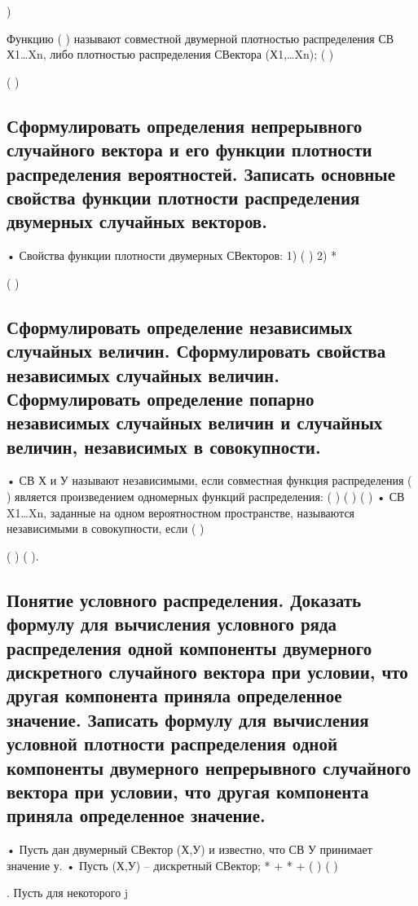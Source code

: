 )





Функцию (
) называют совместной двумерной плотностью распределения СВ Х1…Xn, либо плотностью распределения СВектора
(Х1,…Xn); (
)

( )



\subsection{Сформулировать определения непрерывного случайного вектора и его функции плотности распределения вероятностей. Записать основные свойства функции плотности распределения двумерных случайных векторов.}

• Свойства функции плотности двумерных СВекторов:
1) ( )
2) *

( ) 

\subsection{Сформулировать определение независимых случайных величин. Сформулировать свойства независимых случайных величин. Сформулировать определение попарно независимых случайных величин и случайных величин, независимых в совокупности.}

• СВ Х и У называют независимыми, если совместная функция распределения ( ) является произведением одномерных функций
распределения: ( )
( )
( )
• СВ X1…Xn, заданные на одном вероятностном пространстве, называются независимыми в совокупности, если
(
)


( )
( ).

\subsection{Понятие условного распределения. Доказать формулу для вычисления условного ряда распределения одной компоненты двумерного дискретного случайного вектора при условии, что другая компонента приняла определенное значение. Записать формулу для вычисления условной плотности распределения одной компоненты двумерного непрерывного случайного вектора при условии, что другая компонента приняла определенное значение.}

• Пусть дан двумерный СВектор (Х,У) и известно, что СВ У принимает значение у.
• Пусть (Х,У) – дискретный СВектор; *
+ *
+ {( ) (
	)} {
	
}. Пусть для некоторого j


